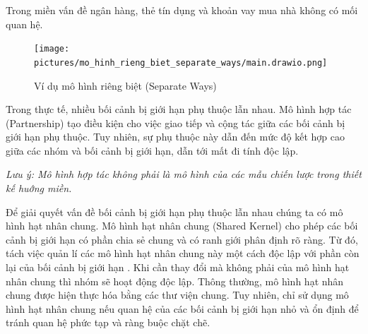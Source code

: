 \begin{example} Trong miền vấn đề ngân hàng, thẻ tín dụng và khoản vay mua nhà không có mối quan hệ.

\begin{figure}[H]

\centering

\texttt{[image: pictures/mo\_hinh\_rieng\_biet\_separate\_ways/main.drawio.png]}

\caption{Ví dụ mô hình riêng biệt (Separate Ways)}

\end{figure}

\end{example}




Trong thực tế, nhiều bối cảnh bị giới hạn phụ thuộc lẫn nhau. Mô hình hợp tác (Partnership) tạo điều kiện cho việc giao tiếp và cộng tác giữa các bối cảnh bị giới hạn phụ thuộc. Tuy nhiên, sự phụ thuộc này dẫn đến mức độ kết hợp cao giữa các nhóm và bối cảnh bị giới hạn, dẫn tới mất đi tính độc lập.

\textit{Lưu ý: Mô hình hợp tác không phải là mô hình của các mẫu chiến lược trong thiết kế huớng miền.}

Để giải quyết vấn đề bối cảnh bị giới hạn phụ thuộc lẫn nhau chúng ta có mô hình hạt nhân chung. Mô hình hạt nhân chung (Shared Kernel) cho phép các bối cảnh bị giới hạn có phần chia sẻ chung và có ranh giới phân định rõ ràng. Từ đó, tách việc quản lí các mô hình hạt nhân chung này một cách độc lập với phần còn lại của bối cảnh bị giới hạn . Khi cần thay đổi mà không phải của mô hình hạt nhân chung thì nhóm sẽ hoạt động độc lập. Thông thường, mô hình hạt nhân chung được hiện thực hóa bằng các thư viện chung. Tuy nhiên, chỉ sử dụng mô hình hạt nhân chung nếu quan hệ của các bối cảnh bị giới hạn nhỏ và ổn định để tránh quan hệ phức tạp và ràng buộc chặt chẽ.







